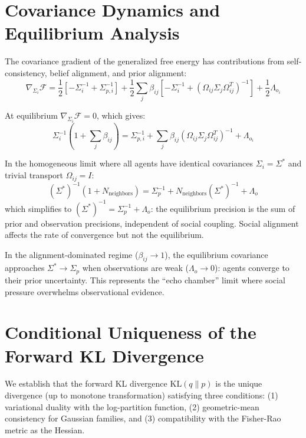 \documentclass[11pt]{article}
\begin{document}
\section{Covariance Dynamics and Equilibrium Analysis}
\label{app:covariance}

The covariance gradient of the generalized free energy has contributions from self-consistency, belief alignment, and prior alignment:
\begin{equation}
\nabla_{\Sigma_i} \mathcal{F} = \frac{1}{2}\left[-\Sigma_i^{-1} + \Sigma_{p,i}^{-1}\right] + \frac{1}{2}\sum_j \beta_{ij}\left[-\Sigma_i^{-1} + (\Omega_{ij}\Sigma_j\Omega_{ij}^T)^{-1}\right] + \frac{1}{2}\Lambda_{o_i}
\end{equation}

At equilibrium $\nabla_{\Sigma_i} \mathcal{F} = 0$, which gives:
\begin{equation}
\Sigma_i^{-1}\left(1 + \sum_j \beta_{ij}\right) = \Sigma_{p,i}^{-1} + \sum_j \beta_{ij}(\Omega_{ij}\Sigma_j\Omega_{ij}^T)^{-1} + \Lambda_{o_i}
\end{equation}

In the homogeneous limit where all agents have identical covariances $\Sigma_i = \Sigma^*$ and trivial transport $\Omega_{ij} = I$:
\begin{equation}
(\Sigma^*)^{-1}(1 + N_{\text{neighbors}}) = \Sigma_p^{-1} + N_{\text{neighbors}}(\Sigma^*)^{-1} + \Lambda_o
\end{equation}
which simplifies to $(\Sigma^*)^{-1} = \Sigma_p^{-1} + \Lambda_o$: the equilibrium precision is the sum of prior and observation precisions, independent of social coupling. Social alignment affects the rate of convergence but not the equilibrium.

In the alignment-dominated regime ($\beta_{ij} \to 1$), the equilibrium covariance approaches $\Sigma^* \to \Sigma_p$ when observations are weak ($\Lambda_o \to 0$): agents converge to their prior uncertainty. This represents the ``echo chamber'' limit where social pressure overwhelms observational evidence.

\section{Conditional Uniqueness of the Forward KL Divergence}
\label{app:forward_kl}

We establish that the forward KL divergence $\mathrm{KL}(q \| p)$ is the unique divergence (up to monotone transformation) satisfying three conditions: (1) variational duality with the log-partition function, (2) geometric-mean consistency for Gaussian families, and (3) compatibility with the Fisher-Rao metric as the Hessian.
\end{document}
